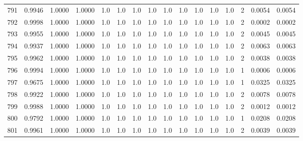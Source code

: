 \begin{tabular}{lrrrrrrrrrrrrrrr}
791 &      0.9946 &  1.0000 &  1.0000 &     1.0 &     1.0 &     1.0 &     1.0 &     1.0 &     1.0 &     1.0 &      1.0 &        1.0 &      2 &                    0.0054 &                     0.0054 \\
792 &      0.9998 &  1.0000 &  1.0000 &     1.0 &     1.0 &     1.0 &     1.0 &     1.0 &     1.0 &     1.0 &      1.0 &        1.0 &      2 &                    0.0002 &                     0.0002 \\
793 &      0.9955 &  1.0000 &  1.0000 &     1.0 &     1.0 &     1.0 &     1.0 &     1.0 &     1.0 &     1.0 &      1.0 &        1.0 &      2 &                    0.0045 &                     0.0045 \\
794 &      0.9937 &  1.0000 &  1.0000 &     1.0 &     1.0 &     1.0 &     1.0 &     1.0 &     1.0 &     1.0 &      1.0 &        1.0 &      2 &                    0.0063 &                     0.0063 \\
795 &      0.9962 &  1.0000 &  1.0000 &     1.0 &     1.0 &     1.0 &     1.0 &     1.0 &     1.0 &     1.0 &      1.0 &        1.0 &      2 &                    0.0038 &                     0.0038 \\
796 &      0.9994 &  1.0000 &  1.0000 &     1.0 &     1.0 &     1.0 &     1.0 &     1.0 &     1.0 &     1.0 &      1.0 &        1.0 &      1 &                    0.0006 &                     0.0006 \\
797 &      0.9675 &  1.0000 &  1.0000 &     1.0 &     1.0 &     1.0 &     1.0 &     1.0 &     1.0 &     1.0 &      1.0 &        1.0 &      1 &                    0.0325 &                     0.0325 \\
798 &      0.9922 &  1.0000 &  1.0000 &     1.0 &     1.0 &     1.0 &     1.0 &     1.0 &     1.0 &     1.0 &      1.0 &        1.0 &      2 &                    0.0078 &                     0.0078 \\
799 &      0.9988 &  1.0000 &  1.0000 &     1.0 &     1.0 &     1.0 &     1.0 &     1.0 &     1.0 &     1.0 &      1.0 &        1.0 &      2 &                    0.0012 &                     0.0012 \\
800 &      0.9792 &  1.0000 &  1.0000 &     1.0 &     1.0 &     1.0 &     1.0 &     1.0 &     1.0 &     1.0 &      1.0 &        1.0 &      1 &                    0.0208 &                     0.0208 \\
801 &      0.9961 &  1.0000 &  1.0000 &     1.0 &     1.0 &     1.0 &     1.0 &     1.0 &     1.0 &     1.0 &      1.0 &        1.0 &      2 &                    0.0039 &                     0.0039 \\

\end{tabular}
